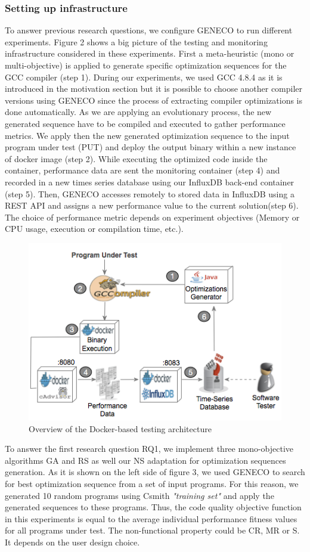 \subsubsection{Setting up infrastructure}
To answer previous research questions, we configure GENECO to run different experiments. Figure 2 shows a big picture of the testing and monitoring infrastructure considered in these experiments. 
First a meta-heuristic (mono or multi-objective) is applied to generate specific optimization sequences for the GCC compiler (step 1). During our experiments, we used GCC 4.8.4 as it is introduced in the motivation section but it is possible to choose another compiler versions using GENECO since the process of extracting compiler optimizations is done automatically. As we are applying an evolutionary process, the new generated sequence have to be compiled and executed to gather performance metrics. We apply then the new generated optimization sequence to the input program under test (PUT) and deploy the output binary within a new instance of docker image (step 2). While executing the optimized code inside the container, performance data are sent the monitoring container (step 4) and recorded in a new times series database using our InfluxDB back-end container (step 5). Then, GENECO accesses remotely to stored data in InfluxDB using a REST API and assigns a new performance value to the current solution(step 6). The choice of performance metric depends on experiment objectives (Memory or CPU usage, execution or compilation time, etc.).
\begin{figure}[h]
	\centering
	\includegraphics[width=0.9\linewidth]{Ressources/infraup.png}
	\caption{Overview of the Docker-based testing architecture}
\end{figure}
To answer the first research question RQ1, we implement three mono-objective algorithms GA and RS as well our NS adaptation for optimization sequences generation. As it is shown on the left side of figure 3, we used GENECO to search for best optimization sequence from a set of input programs. For this reason, we generated 10 random programs using Csmith \textit{"training set"} and apply the generated sequences to these programs. Thus, the code quality objective function in this
experiments is equal to the average individual performance fitness values for all programs under test. The non-functional property could be CR, MR or S. It depends on the user design choice.

